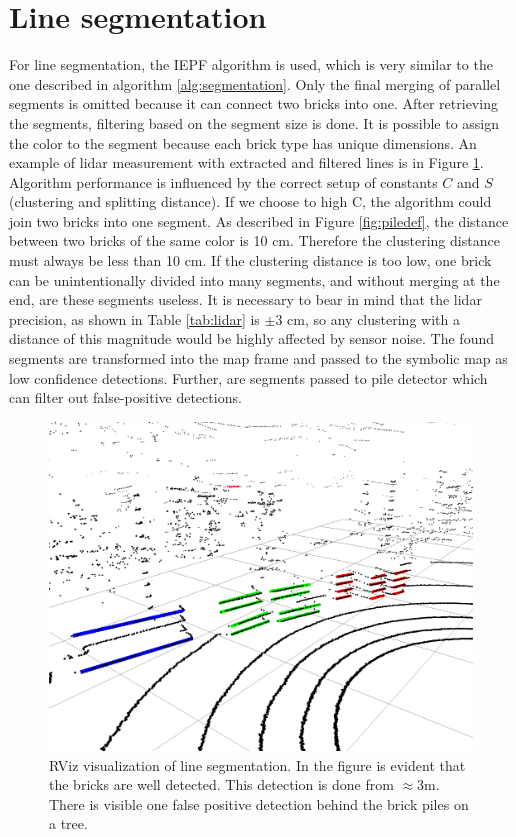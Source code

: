 \section{Line segmentation}
For line segmentation, the IEPF algorithm is used, which is very similar to the one described in algorithm \ref{alg:segmentation}. Only the final merging of parallel segments is omitted because it can connect two bricks into one. After retrieving the segments, filtering based on the segment size is done. It is possible to assign the color to the segment because each brick type has unique dimensions. An example of lidar measurement with extracted and filtered lines is in Figure \ref{fig:segments}. Algorithm performance is influenced by the correct setup of constants $C$ and $S$ (clustering and splitting distance). If we choose to high C, the algorithm could join two bricks into one segment. As described in Figure \ref{fig:piledef}, the distance between two bricks of the same color is 10 cm. Therefore the clustering distance must always be less than 10 cm. If the clustering distance is too low, one brick can be unintentionally divided into many segments, and without merging at the end, are these segments useless. It is necessary to bear in mind that the lidar precision, as shown in Table \ref{tab:lidar} is $\pm3$ cm, so any clustering with a distance of this magnitude would be highly affected by sensor noise. The found segments are transformed into the map frame and passed to the symbolic map as low confidence detections. Further, are segments passed to pile detector which can filter out false-positive detections.

\hspace{8mm}

\begin{figure}[H]
\centering
\includegraphics[scale=0.43]{fig/segments}
\caption[Line segmentation visualization]{RViz visualization of line segmentation. In the figure is evident that the bricks are well detected. This detection is done from $\approx3$m. There is visible one false positive detection behind the brick piles on a tree.}
\label{fig:segments}
\end{figure}


